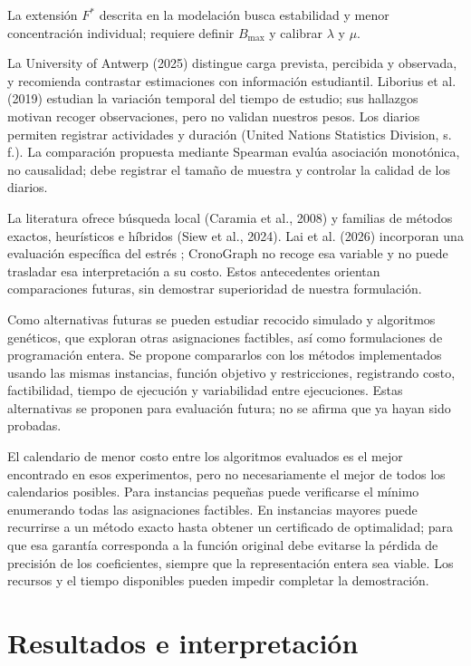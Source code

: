 \documentclass[12pt,letterpaper]{article}
\begin{document}
La extensión $F^*$ descrita en la modelación busca estabilidad y menor concentración individual; requiere definir $B_{\max}$ y calibrar $\lambda$ y $\mu$.

La University of Antwerp (2025) distingue carga prevista, percibida y observada, y recomienda contrastar estimaciones con información estudiantil. Liborius et al. (2019) estudian la variación temporal del tiempo de estudio; sus hallazgos motivan recoger observaciones, pero no validan nuestros pesos. Los diarios permiten registrar actividades y duración (United Nations Statistics Division, s. f.). La comparación propuesta mediante Spearman evalúa asociación monotónica, no causalidad; debe registrar el tamaño de muestra y controlar la calidad de los diarios.

La literatura ofrece búsqueda local (Caramia et al., 2008) y familias de métodos exactos, heurísticos e híbridos (Siew et al., 2024). Lai et al. (2026) incorporan una evaluación específica del estrés ; CronoGraph no recoge esa variable y no puede trasladar esa interpretación a su costo. Estos antecedentes orientan comparaciones futuras, sin demostrar superioridad de nuestra formulación.

Como alternativas futuras se pueden estudiar recocido simulado y algoritmos genéticos, que exploran otras asignaciones factibles, así como formulaciones de programación entera. Se propone compararlos con los métodos implementados usando las mismas instancias, función objetivo y restricciones, registrando costo, factibilidad, tiempo de ejecución y variabilidad entre ejecuciones. Estas alternativas se proponen para evaluación futura; no se afirma que ya hayan sido probadas.

El calendario de menor costo entre los algoritmos evaluados es el mejor encontrado en esos experimentos, pero no necesariamente el mejor de todos los calendarios posibles. Para instancias pequeñas puede verificarse el mínimo enumerando todas las asignaciones factibles. En instancias mayores puede recurrirse a un método exacto hasta obtener un certificado de optimalidad; para que esa garantía corresponda a la función original debe evitarse la pérdida de precisión de los coeficientes, siempre que la representación entera sea viable. Los recursos y el tiempo disponibles pueden impedir completar la demostración.

\section{Resultados e interpretación}
\end{document}
